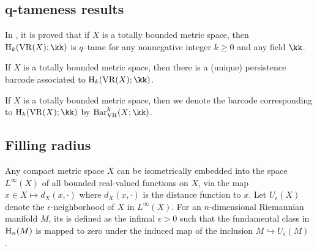 \subsection{q-tameness results}

\begin{remark}
	In \cite{bib11}, it is proved that if $X$ is a totally bounded metric space, then $\rH_k(\VR(X); \kk)$ is $q$–tame for any nonnegative integer $k \geq 0$ and any field $\kk$.
\end{remark}

\begin{theorem}
	If $X$ is a totally bounded metric space, then there is a (unique) persistence barcode associated to $\rH_k(\VR(X); \kk)$.
\end{theorem}

If $X$ is a totally bounded metric space, then we denote the barcode corresponding to $\rH_k(\VR(X); \kk)$ by $\barc_{\VR}^k(X; \kk)$.


\subsection{Filling radius}\label{ss:filling_radius}

Any compact metric space $X$ can be isometrically embedded into the space $L^\infty(X)$ of all bounded real-valued functions on $X$, via the map $x\in X\mapsto d_X(x,\cdot)$ where $d_X(x,\cdot)$ is the distance function to $x$. Let $U_\epsilon(X)$ denote the $\epsilon$-neighborhood of $X$ in $L^\infty(X)$.
For an $n$-dimensional Riemannian manifold $M$, its  is defined as the infimal $\epsilon>0$ such that the fundamental class in $\operatorname{H}_n(M)$ is mapped to zero under the induced map of the inclusion $M \hookrightarrow U_\epsilon(M)$ \cite[page 108]{gromov2007metric}.

